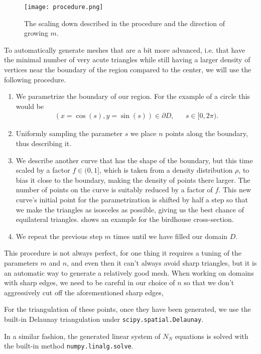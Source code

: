 \documentclass[10pt,a4paper,twocolumn]{article}
\begin{document}
\begin{figure}[!h]
    \centering
    \texttt{[image: procedure.png]}
    \caption{The scaling down described in the procedure and the direction of growing $m$.}
    \label{fig:procedure}
\end{figure}

To automatically generate meshes that are a bit more advanced, i.e. that have the minimal number of very acute triangles while still having a larger density of vertices near the boundary of the region compared to the center, we will use the following procedure.
\begin{enumerate}
    \item We parametrize the boundary of our region. For the example of a circle this would be
    \begin{align}
        &(x = \cos(s), y = \sin(s)) \in \partial D,& &s \in [0, 2 \pi).&
    \end{align}
    \item Uniformly sampling the parameter $s$ we place $n$ points along the boundary, thus describing it.
    \item We describe another curve that has the shape of the boundary, but this time scaled by a factor $f \in (0,1]$, which is taken from a density distribution $\rho$, to bias it close to the boundary, making the density of points there larger. The number of points on the curve is suitably reduced by a factor of $f$. This new curve's initial point for the parametrization is shifted by half a step so that we make the triangles as isosceles as possible, giving us the best chance of equilateral triangles.  shows an example for the birdhouse cross-section.
    \item We repeat the previous step $m$ times until we have filled our domain $D$.
\end{enumerate}

This procedure is not always perfect, for one thing it requires a tuning of the parameters $m$ and $n$, and even then it can't always avoid sharp triangles, but it is an automatic way to generate a relatively good mesh. When working on domains with sharp edges, we need to be careful in our choice of $n$ so that we don't aggressively cut off the aforementioned sharp edges,

For the triangulation of these points, once they have been generated, we use the built-in Delaunay triangulation under \texttt{scipy.spatial.Delaunay}.

In a similar fashion, the generated linear system of $N_N$ equations is solved with the built-in method \texttt{numpy.linalg.solve}.
\end{document}
